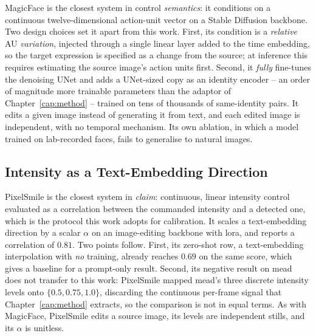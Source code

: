 MagicFace \citep{wei2025magicface} is the closest system in control \emph{semantics}: it
conditions on a continuous twelve-dimensional action-unit vector on a Stable Diffusion backbone.
Two design choices set it apart from this work. First, its condition is a \emph{relative} AU
\emph{variation}, injected through a single linear layer added to the time
embedding, so the target expression is specified as a change from the source; at inference this
requires estimating the source image's action units first. Second, it \emph{fully} fine-tunes
the denoising UNet and adds a UNet-sized copy as an identity encoder -- an order of magnitude
more trainable parameters than the adaptor of Chapter~\ref{cap:method} -- trained on tens of
thousands of same-identity pairs. It edits a given image instead of generating it from text, and
each edited image is independent, with no temporal mechanism. Its own ablation,
in which a model trained on lab-recorded faces, fails to generalise to natural images.

\subsection{Intensity as a Text-Embedding Direction}\label{subsec:rw-pixelsmile}


PixelSmile \citep{hua2026pixelsmile} is the closest system in \emph{claim}: continuous, linear
intensity control evaluated as a correlation between the commanded intensity and a detected one, which is the protocol this work adopts for calibration. It scales
a text-embedding direction by a scalar $\alpha$ on an image-editing backbone with \gls{lora}, and
reports a correlation of $0.81$. Two points follow. First, its zero-shot row, a text-embedding
interpolation with \emph{no} training, already reaches $0.69$ on the same score, which gives a baseline for a prompt-only result. Second, its negative
result on \gls{mead} does not transfer to this work: PixelSmile mapped \gls{mead}'s three
discrete intensity levels onto $\{0.5,0.75,1.0\}$, discarding the continuous per-frame signal
that Chapter~\ref{cap:method} extracts, so the comparison is not in equal terms. As with MagicFace, PixelSmile edits a source image, its levels are independent stills, and its $\alpha$
is unitless.

